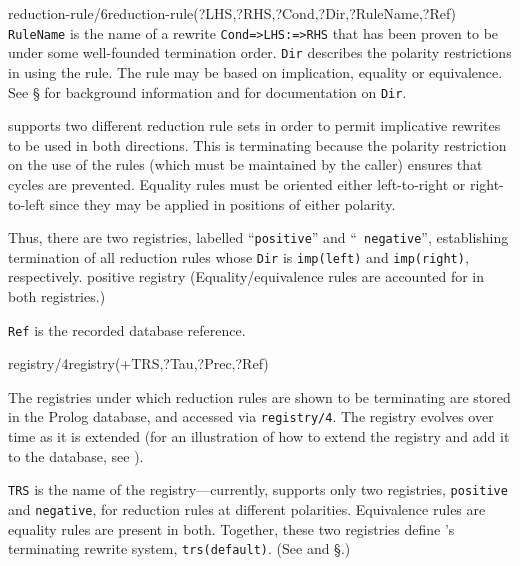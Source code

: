 \begin{predicate}
  {reduction-rule/6}{reduction-rule(?LHS,?RHS,?Cond,?Dir,?RuleName,?Ref)}%
{\tt RuleName} is the name of a rewrite {\tt Cond=>LHS:=>RHS} that has
been proven to be  under some well-founded
termination order.  {\tt Dir} describes the polarity restrictions in
using the rule.  The rule may be based on implication, equality or
equivalence. See \S{} for background information and
 for documentation on {\tt Dir}.

\clam supports two different reduction rule sets in order to permit
implicative rewrites to be used in both directions.  This is
terminating because the polarity restriction on the use of the rules
(which must be maintained by the caller) ensures that cycles are
prevented.  Equality rules must be oriented either left-to-right or
right-to-left since they may be applied in positions of either
polarity.

Thus, there are two registries, labelled ``{\tt positive}'' and ``{\tt
negative}'', establishing termination of all reduction rules whose
{\tt Dir} is {\tt imp(left)} and {\tt imp(right)}, respectively.\index
{positive registry}
(Equality/equivalence rules are accounted for in both registries.)

{\tt Ref} is the recorded database reference.
\end{predicate}

\begin{predicate}{registry/4}{registry(+TRS,?Tau,?Prec,?Ref)}%

The registries under
which reduction rules are shown to be terminating are stored in the
Prolog database, and accessed via {\tt registry/4}.  The registry
evolves over time as it is extended (for an illustration of how to
extend the registry and add it to the database, see ).

{\tt TRS} is the name of the registry---currently, \clam supports only
two registries, {\tt positive} and {\tt negative}, for reduction rules
at different polarities.  Equivalence rules are equality rules are
present in both.  Together, these two registries define \clam's
terminating rewrite system, {\tt trs(default)}.  (See
 and \S{}.)
\end{predicate}

